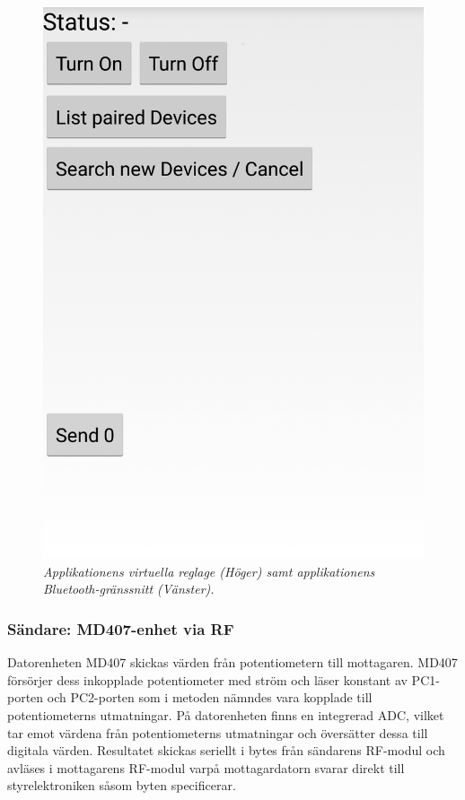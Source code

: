 \documentclass[a4paper]{article}
\begin{document}
\begin{figure}[H]
\includegraphics[scale=0.2]{applikation2.png}
\centering
\caption{\it Applikationens virtuella reglage (Höger) samt applikationens Bluetooth-gränssnitt (Vänster).}
\end{figure} 

\subsubsection{Sändare: MD407-enhet via RF}
Datorenheten MD407 skickas värden från potentiometern till mottagaren. MD407 försörjer dess inkopplade potentiometer med ström och läser konstant av PC1-porten och PC2-porten som i metoden nämndes vara kopplade till potentiometerns utmatningar. På datorenheten finns en integrerad ADC, vilket tar emot värdena från potentiometerns utmatningar och översätter dessa till digitala värden. Resultatet skickas seriellt i bytes från sändarens RF-modul och avläses i mottagarens RF-modul varpå mottagardatorn svarar direkt till styrelektroniken såsom byten specificerar.
\end{document}
